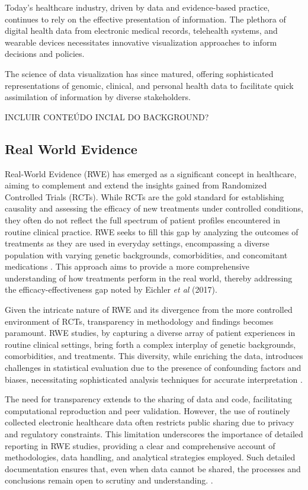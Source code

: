 Today's healthcare industry, driven by data and evidence-based practice, continues to rely on the effective presentation of information. The plethora of digital health data from electronic medical records, telehealth systems, and wearable devices necessitates innovative visualization approaches to inform decisions and policies.

The science of data visualization has since matured, offering sophisticated representations of genomic, clinical, and personal health data to facilitate quick assimilation of information by diverse stakeholders.

INCLUIR CONTEÚDO INCIAL DO BACKGROUND?

\subsection{Real World Evidence}\label{real-world-evidence}

Real-World Evidence (RWE) has emerged as a significant concept in healthcare, aiming to complement and extend the insights gained from Randomized Controlled Trials (RCTs). While RCTs are the gold standard for establishing causality and assessing the efficacy of new treatments under controlled conditions, they often do not reflect the full spectrum of patient profiles encountered in routine clinical practice. RWE seeks to fill this gap by analyzing the outcomes of treatments as they are used in everyday settings, encompassing a diverse population with varying genetic backgrounds, comorbidities, and concomitant medications \cite{soa1}. This approach aims to provide a more comprehensive understanding of how treatments perform in the real world, thereby addressing the efficacy-effectiveness gap noted by Eichler \textit{et al} (2017)\cite{soa2}.

Given the intricate nature of RWE and its divergence from the more controlled environment of RCTs, transparency in methodology and findings becomes paramount. RWE studies, by capturing a diverse array of patient experiences in routine clinical settings, bring forth a complex interplay of genetic backgrounds, comorbidities, and treatments. This diversity, while enriching the data, introduces challenges in statistical evaluation due to the presence of confounding factors and biases, necessitating sophisticated analysis techniques for accurate interpretation \cite{soa3}\cite{soa4}.

The need for transparency extends to the sharing of data and code, facilitating computational reproduction and peer validation. However, the use of routinely collected electronic healthcare data often restricts public sharing due to privacy and regulatory constraints. This limitation underscores the importance of detailed reporting in RWE studies, providing a clear and comprehensive account of methodologies, data handling, and analytical strategies employed. Such detailed documentation ensures that, even when data cannot be shared, the processes and conclusions remain open to scrutiny and understanding. \cite{soa5}\cite{soa6}.

